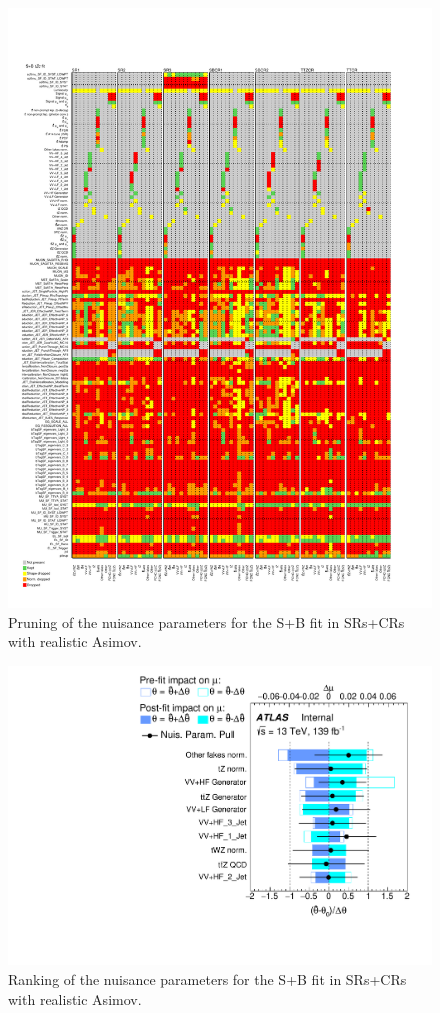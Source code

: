 \begin{figure}[htbp]
	\centering
	\includegraphics[width=.85\textwidth]{Appendices/AP8/figures/SPLUSB_CRSR_UsingSMTFullSys/Pruning}
	\caption{Pruning of the nuisance parameters for the S+B \tZc fit in SRs+CRs with realistic Asimov.}%
	\label{fig:stat_smt:tzc:splusb:crsr:pruning}
\end{figure}

\begin{figure}[htbp]
	\centering
	\includegraphics[width=.9\textwidth]{Appendices/AP8/figures/SPLUSB_CRSR_UsingSMTFullSys/Ranking}
	\caption{Ranking of the nuisance parameters for the S+B \tZc fit in SRs+CRs with realistic Asimov.}%
	\label{fig:stat_smt:tzc:splusb:crsr:ranking}
\end{figure}

